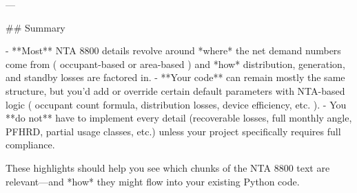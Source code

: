 ---

## Summary

- **Most** NTA 8800 details revolve around *where* the net demand numbers come from ( occupant-based or area-based ) and *how* distribution, generation, and standby losses are factored in.  
- **Your code** can remain mostly the same structure, but you’d add or override certain default parameters with NTA-based logic ( occupant count formula, distribution losses, device efficiency, etc. ).  
- You **do not** have to implement every detail (recoverable losses, full monthly angle, PFHRD, partial usage classes, etc.) unless your project specifically requires full compliance.  

These highlights should help you see which chunks of the NTA 8800 text are relevant—and *how* they might flow into your existing Python code.






